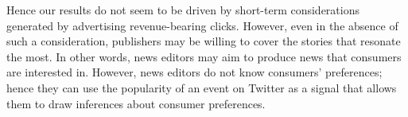 Hence our results do not seem to be driven by short-term considerations generated by advertising revenue-bearing clicks. However, even in the absence of such a consideration, publishers may be willing to cover the stories that resonate the most. In other words, news editors may aim to produce news that consumers are interested in. However, news editors do not know consumers' preferences; hence they can use the popularity of an event on Twitter as a signal that allows them to draw inferences about consumer preferences.

%
%
%
%
